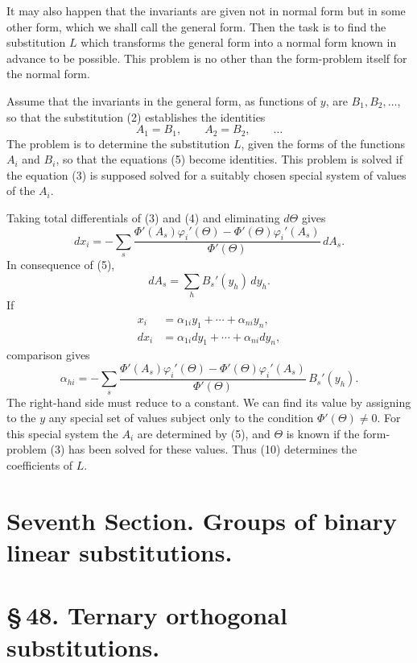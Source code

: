 \documentclass[11pt]{article}
\begin{document}
It may also happen that the invariants are given not in normal form but in some other form, which we shall call the general form. Then the task is to find the substitution $L$ which transforms the general form into a normal form known in advance to be possible. This problem is no other than the form-problem itself for the normal form.

Assume that the invariants in the general form, as functions of $y$, are $B_1,B_2,\ldots$, so that the substitution (2) establishes the identities
\begin{equation}
A_1=B_1,
\qquad A_2=B_2,
\qquad \ldots
\tag{5}
\end{equation}
The problem is to determine the substitution $L$, given the forms of the functions $A_i$ and $B_i$, so that the equations (5) become identities. This problem is solved if the equation (3) is supposed solved for a suitably chosen special system of values of the $A_i$.

Taking total differentials of (3) and (4) and eliminating $d\Theta$ gives
\begin{equation}
dx_i=-\sum_s\frac{\Phi'(A_s)\varphi_i'(\Theta)-\Phi'(\Theta)\varphi_i'(A_s)}{\Phi'(\Theta)}\,dA_s.
\tag{6}
\end{equation}
In consequence of (5),
\begin{equation}
dA_s=\sum_hB_s'(y_h)\,dy_h.
\tag{7}
\end{equation}
If
\begin{align}
x_i&=\alpha_{1i}y_1+\cdots+\alpha_{ni}y_n,\tag{8}\\
dx_i&=\alpha_{1i}dy_1+\cdots+\alpha_{ni}dy_n,\tag{9}
\end{align}
comparison gives
\begin{equation}
\alpha_{hi}=-\sum_s\frac{\Phi'(A_s)\varphi_i'(\Theta)-\Phi'(\Theta)\varphi_i'(A_s)}{\Phi'(\Theta)}\,B_s'(y_h).
\tag{10}
\end{equation}
The right-hand side must reduce to a constant. We can find its value by assigning to the $y$ any special set of values subject only to the condition $\Phi'(\Theta)\neq0$. For this special system the $A_i$ are determined by (5), and $\Theta$ is known if the form-problem (3) has been solved for these values. Thus (10) determines the coefficients of $L$.

\section*{Seventh Section. Groups of binary linear substitutions.}
\section*{\S\,48. Ternary orthogonal substitutions.}
\end{document}

